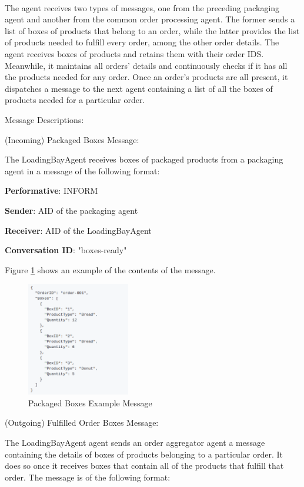 \documentclass[11pt, a4paper]{article}
\begin{document}
\begin{enumerate}
	\paragraph{}
	The agent receives two types of messages, one from the preceding packaging agent and another from the common order processing agent. The former sends a list of boxes of products that belong to an order, while the latter provides the list of products needed to fulfill every order, among the other order details. The agent receives boxes of products and retains them with their order IDS. Meanwhile, it maintains all orders' details and continuously checks if it has all the products needed for any order. Once an order's products are all present, it dispatches a message to the next agent containing a list of all the boxes of products needed for a particular order.
	
	Message Descriptions:
	
	(Incoming) Packaged Boxes Message:
	
	The LoadingBayAgent receives boxes of packaged products from a packaging agent in a message of the following format:
	
	\textbf{Performative}: INFORM
	
	\textbf{Sender}: AID of the packaging agent
	
	\textbf{Receiver}: AID of the LoadingBayAgent
	
	\textbf{Conversation ID}: "boxes-ready"
	
	Figure \ref{loadingbaymsg1example} shows an example of the contents of the message.
	\begin{figure}[h!]
		\centering
		\includegraphics[width=0.4\textwidth]{../images/loadingbaymsg1example.png}
		\caption{Packaged Boxes Example Message}
		\label{loadingbaymsg1example}
	\end{figure}
	
	(Outgoing) Fulfilled Order Boxes Message:
	
	The LoadingBayAgent agent sends an order aggregator agent a message containing the details of boxes of products belonging to a particular order. It does so once it receives boxes that contain all of the products that fulfill that order. The message is of the following format:
	

\end{enumerate}
\end{document}
